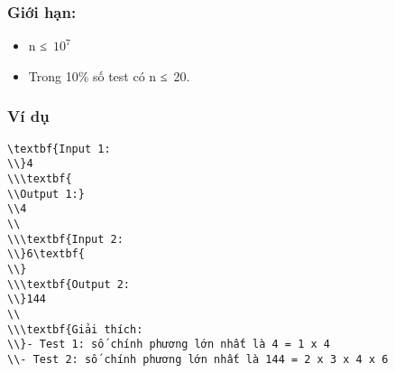 \subsubsection{\textbf{    Giới hạn:   }}
\begin{itemize}
	\item     n ≤ $10^{7}$
	\item     Trong 10\% số test có n ≤ 20.   
\end{itemize}

\subsubsection{   Ví dụ  }
\begin{verbatim}
\textbf{Input 1:
\\}4
\\\textbf{
\\Output 1:}
\\4
\\
\\\textbf{Input 2:
\\}6\textbf{
\\}
\\\textbf{Output 2:
\\}144
\\
\\\textbf{Giải thích:
\\}- Test 1: số chính phương lớn nhất là 4 = 1 x 4
\\- Test 2: số chính phương lớn nhất là 144 = 2 x 3 x 4 x 6\end{verbatim}

